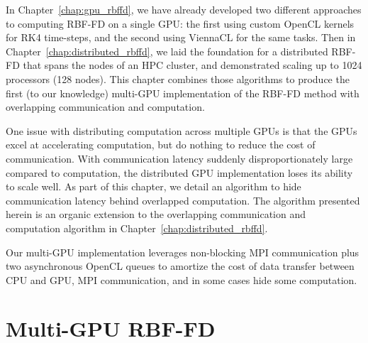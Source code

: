 In Chapter~\ref{chap:gpu_rbffd}, we have already developed two different approaches to computing RBF-FD on a single GPU: the first using custom OpenCL kernels for RK4 time-steps, and the second using ViennaCL for the same tasks. Then in Chapter~\ref{chap:distributed_rbffd}, we laid the foundation for a distributed RBF-FD that spans the nodes of an HPC cluster, and demonstrated scaling up to 1024 processors (128 nodes). This chapter combines those algorithms to produce the first (to our knowledge) multi-GPU implementation of the RBF-FD method with overlapping communication and computation. 

One issue with distributing computation across multiple GPUs is that the GPUs excel at accelerating computation, but do nothing to reduce the cost of communication. With communication latency suddenly disproportionately large compared to computation, the distributed GPU implementation loses its ability to scale well. As part of this chapter, we detail an algorithm to hide communication latency behind overlapped computation. The algorithm presented herein is an organic extension to the overlapping communication and computation algorithm in Chapter~\ref{chap:distributed_rbffd}. 

Our multi-GPU implementation leverages non-blocking MPI communication plus two asynchronous OpenCL queues to amortize the cost of data transfer between CPU and GPU, MPI communication, and in some cases hide some computation. 

%



\section{Multi-GPU RBF-FD}


